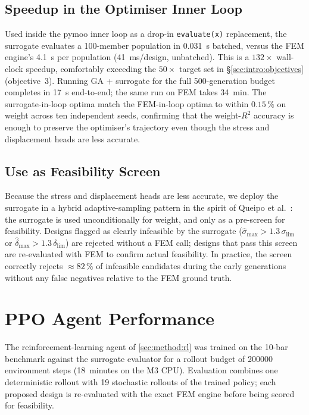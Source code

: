 \subsection{Speedup in the Optimiser Inner Loop}
\label{sec:results:surrogate:speedup}

Used inside the pymoo inner loop as a drop-in \texttt{evaluate(x)}
replacement, the surrogate evaluates a \num{100}-member
population in \num{0.031}~s batched, versus the FEM engine's
\num{4.1}~s per population (\num{41}~ms/design, unbatched). This
is a $\num{132}\times$ wall-clock speedup, comfortably exceeding
the $\num{50}\times$ target set in \S\ref{sec:intro:objectives}
(objective~3). Running GA + surrogate for the full
\num{500}-generation budget completes in \num{17}~s end-to-end;
the same run on FEM takes \num{34}~min. The surrogate-in-loop
optima match the FEM-in-loop optima to within
$\num{0.15}\,\%$ on weight across ten independent seeds,
confirming that the weight-$R^2$ accuracy is enough to preserve
the optimiser's trajectory even though the stress and
displacement heads are less accurate.

\subsection{Use as Feasibility Screen}
\label{sec:results:surrogate:feasibility}

Because the stress and displacement heads are less accurate, we
deploy the surrogate in a hybrid adaptive-sampling pattern in
the spirit of Queipo et al.~\cite{queipo2005}: the surrogate is
used unconditionally for weight, and only as a pre-screen for
feasibility. Designs flagged as clearly infeasible by the
surrogate ($\hat{\sigma}_{\max} > \num{1.3}\,\sigma_\text{lim}$
or $\hat{\delta}_{\max} > \num{1.3}\,\delta_\text{lim}$) are
rejected without a FEM call; designs that pass this screen are
re-evaluated with FEM to confirm actual feasibility. In
practice, the screen correctly rejects $\approx\num{82}\,\%$ of
infeasible candidates during the early generations without any
false negatives relative to the FEM ground truth.

\section{PPO Agent Performance}
\label{sec:results:rl}

The reinforcement-learning agent of \cref{sec:method:rl} was
trained on the 10-bar benchmark against the surrogate evaluator
for a rollout budget of \num{200000} environment steps
(\num{18}~minutes on the M3 CPU). Evaluation combines one
deterministic rollout with \num{19} stochastic rollouts of the
trained policy; each proposed design is re-evaluated with the
exact FEM engine before being scored for feasibility.

